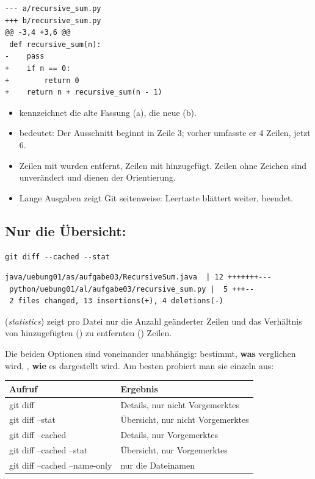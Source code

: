 \begin{lstlisting}[style=ausgabe]
--- a/recursive_sum.py
+++ b/recursive_sum.py
@@ -3,4 +3,6 @@
 def recursive_sum(n):
-    pass
+    if n == 0:
+        return 0
+    return n + recursive_sum(n - 1)
\end{lstlisting}

\begin{itemize}
  \item \cmd{---} kennzeichnet die alte Fassung (a), \cmd{+++} die neue (b).
  \item {} bedeutet: Der Ausschnitt beginnt in Zeile 3; vorher umfasste er
        4 Zeilen, jetzt 6.
  \item Zeilen mit \cmd{-} wurden entfernt, Zeilen mit \cmd{+} hinzugefügt. Zeilen ohne
        Zeichen sind unverändert und dienen der Orientierung.
  \item Lange Ausgaben zeigt Git seitenweise: Leertaste blättert weiter,  beendet.
\end{itemize}

\subsection*{Nur die Übersicht: \texorpdfstring{}{--stat}}

\begin{lstlisting}[style=befehle]
git diff --cached --stat
\end{lstlisting}

\begin{lstlisting}[style=ausgabe]
 java/uebung01/as/aufgabe03/RecursiveSum.java  | 12 +++++++---
 python/uebung01/al/aufgabe03/recursive_sum.py |  5 +++--
 2 files changed, 13 insertions(+), 4 deletions(-)
\end{lstlisting}

 (\emph{statistics}) zeigt pro Datei nur die Anzahl geänderter Zeilen und das
Verhältnis von hinzugefügten (\cmd{+}) zu entfernten (\cmd{-}) Zeilen.

Die beiden Optionen sind voneinander unabhängig:  bestimmt, \textbf{was}
verglichen wird, , \textbf{wie} es dargestellt wird. Am besten probiert man sie
einzeln aus:

\begin{center}
\renewcommand{\arraystretch}{1.25}
\begin{tabularx}{\linewidth}{@{}>{\ttfamily}l>{\raggedright\arraybackslash}X@{}}
  \toprule
  \normalfont\textbf{Aufruf} & \textbf{Ergebnis} \\
  \midrule
  git diff                      & Details, nur nicht Vorgemerktes \\
  git diff --stat               & Übersicht, nur nicht Vorgemerktes \\
  git diff --cached             & Details, nur Vorgemerktes \\
  git diff --cached --stat      & Übersicht, nur Vorgemerktes \\
  git diff --cached --name-only & nur die Dateinamen \\
  \bottomrule
\end{tabularx}
\end{center}


